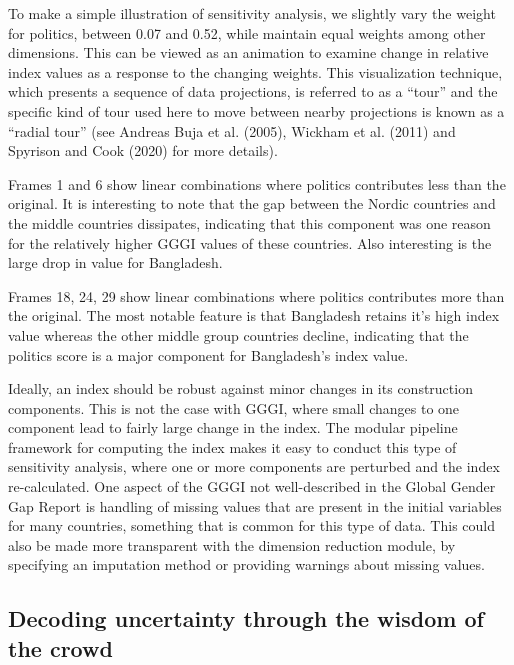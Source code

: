 \documentclass[
]{interact}
\begin{document}
To make a simple illustration of sensitivity analysis, we slightly vary
the weight for politics, between 0.07 and 0.52, while maintain equal
weights among other dimensions. This can be viewed as an animation to
examine change in relative index values as a response to the changing
weights. This visualization technique, which presents a sequence of data
projections, is referred to as a ``tour'' and the specific kind of tour
used here to move between nearby projections is known as a ``radial
tour'' (see Andreas Buja et al. (2005), Wickham et al. (2011) and
Spyrison and Cook (2020) for more details).

Frames 1 and 6 show linear combinations where politics contributes less
than the original. It is interesting to note that the gap between the
Nordic countries and the middle countries dissipates, indicating that
this component was one reason for the relatively higher GGGI values of
these countries. Also interesting is the large drop in value for
Bangladesh.

Frames 18, 24, 29 show linear combinations where politics contributes
more than the original. The most notable feature is that Bangladesh
retains it's high index value whereas the other middle group countries
decline, indicating that the politics score is a major component for
Bangladesh's index value.

Ideally, an index should be robust against minor changes in its
construction components. This is not the case with GGGI, where small
changes to one component lead to fairly large change in the index. The
modular pipeline framework for computing the index makes it easy to
conduct this type of sensitivity analysis, where one or more components
are perturbed and the index re-calculated. One aspect of the GGGI not
well-described in the Global Gender Gap Report is handling of missing
values that are present in the initial variables for many countries,
something that is common for this type of data. This could also be made
more transparent with the dimension reduction module, by specifying an
imputation method or providing warnings about missing values.

\subsection{Decoding uncertainty through the wisdom of the
crowd}\label{decoding-uncertainty-through-the-wisdom-of-the-crowd}
\end{document}
